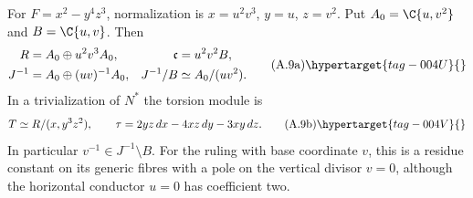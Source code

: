 
\begin{proposition}\hypertarget{tag-01AJ}{}\label{cdp:st:A.2.5}


For $F=x^2-y^4z^3$, normalization is $x=u^2v^3$, $y=u$, $z=v^2$. Put $A_0=\C\{u,v^2\}$ and $B=\C\{u,v\}$. Then
\[
 \begin{aligned}
 R&=A_0\oplus u^2v^3A_0,&\mathfrak c&=u^2v^2B,\\
 J^{-1}&=A_0\oplus(uv)^{-1}A_0,&
 J^{-1}/B&\simeq A_0/(uv^2).
 \end{aligned}
 \tag{A.9a}\hypertarget{tag-004U}{}\label{cdp:eq:A.9a}
\]
In a trivialization of $N^*$ the torsion module is
\[
 T\simeq R/(x,y^3z^2),\qquad
 \tau=2yz\,dx-4xz\,dy-3xy\,dz.
 \tag{A.9b}\hypertarget{tag-004V}{}\label{cdp:eq:A.9b}
\]
In particular $v^{-1}\in J^{-1}\setminus B$. For the ruling with base coordinate $v$, this is a residue constant on its generic fibres with a pole on the vertical divisor $v=0$, although the horizontal conductor $u=0$ has coefficient two.
\end{proposition}

